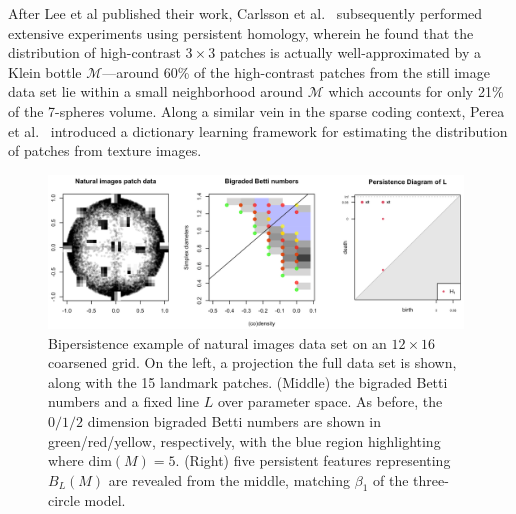 \documentclass[sn-mathphys]{sn-jnl}
\begin{document}
After Lee et al published their work, Carlsson et al.~\cite{carlsson2008local} subsequently performed extensive experiments using persistent homology, wherein he found that the distribution of high-contrast $3 \times 3$ patches is actually well-approximated by a Klein bottle $\mathcal{M}$---around 60\% of the high-contrast patches from the still image data set lie within a small neighborhood around $\mathcal{M}$ which accounts for only 21\% of the 7-spheres volume. Along a similar vein in the sparse coding context, Perea et al.~\cite{perea2014klein} introduced a dictionary learning framework for estimating the distribution of patches from texture images. 

 \begin{figure}[t]
	\includegraphics[width=0.98\textwidth]{natural_images}
	\caption{Bipersistence example of natural images data set on an $12 \times 16$ coarsened grid. On the left, a projection the full data set is shown, along with the 15 landmark patches. (Middle) the bigraded Betti numbers and a fixed line $L$ over parameter space. 
	As before, the $0/1/2$ dimension bigraded Betti numbers are shown in green/red/yellow, respectively, with the blue region highlighting where $\mathrm{dim}(M) = 5$. (Right) five persistent features representing $B_L(M)$ are revealed from the middle, matching $\beta_1$ of the three-circle model. }
	\label{fig:patch_data_dgm}
\end{figure}
\end{document}
